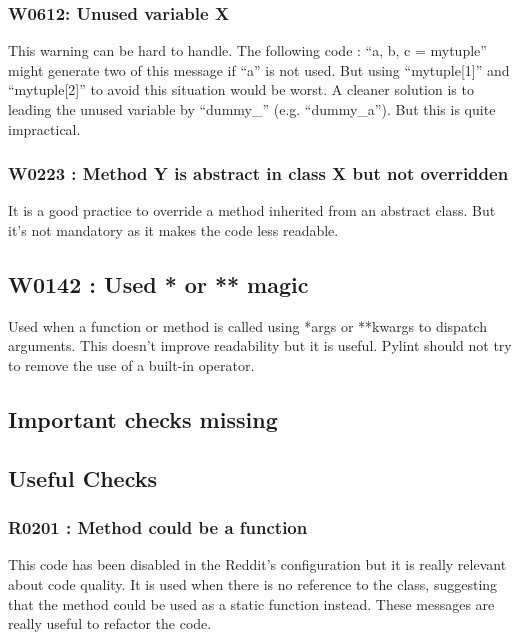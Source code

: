\documentclass[11pt, a4paper]{article}
\newcommand{\pyl}{\textsf{Pylint}}
\begin{document}
\subsubsection*{W0612: Unused variable X}

This warning can be hard to handle. 
The following code : ``a, b, c = mytuple'' might generate two of this message if ``a'' is not used.
But using ``mytuple[1]'' and ``mytuple[2]'' to avoid this situation would be worst.
A cleaner solution is to leading the unused variable by ``dummy\_'' (e.g. ``dummy\_a'').
But this is quite impractical.

\subsubsection*{W0223 : Method Y is abstract in class X but not overridden}

It is a good practice to override a method inherited from an abstract class. 
But it's not mandatory as it makes the code less readable.

\subsection*{W0142 : Used * or ** magic}

Used when a function or method is called using *args or **kwargs to dispatch arguments. 
This doesn't improve readability but it is useful.
\pyl{} should not try to remove the use of a built-in operator.


\subsection*{Important checks missing}

\subsection*{Useful Checks}

\subsubsection*{R0201 : Method could be a function}

This code has been disabled in the Reddit's configuration but it is really relevant about code quality. 
It is used when there is no reference to the class, suggesting that the method could be used as a static function instead.
These messages are really useful to refactor the code.
\end{document}
